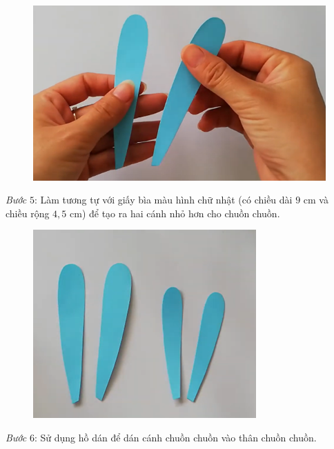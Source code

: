\begin{multicols}{2}
\begin{figure}[H]
		\includegraphics[width= 1\linewidth]{71}
		\vspace*{-10pt}
	\end{figure}
	\textit{Bước} $5$: Làm tương tự với giấy bìa màu hình chữ nhật (có chiều dài $9$ cm và chiều rộng $4{,}5$ cm) để tạo ra hai cánh nhỏ hơn cho chuồn chuồn.
	\begin{figure}[H]
		\vspace*{-5pt}
		\centering
		\captionsetup{labelformat= empty, justification=centering}
		\includegraphics[width= 1\linewidth]{72}
		\vspace*{-10pt}
	\end{figure}
	\textit{Bước} $6$: Sử dụng hồ dán để dán cánh chuồn chuồn vào thân chuồn chuồn.
	\begin{figure}[H]
		\vspace*{-5pt}

\end{figure}
\end{multicols}
